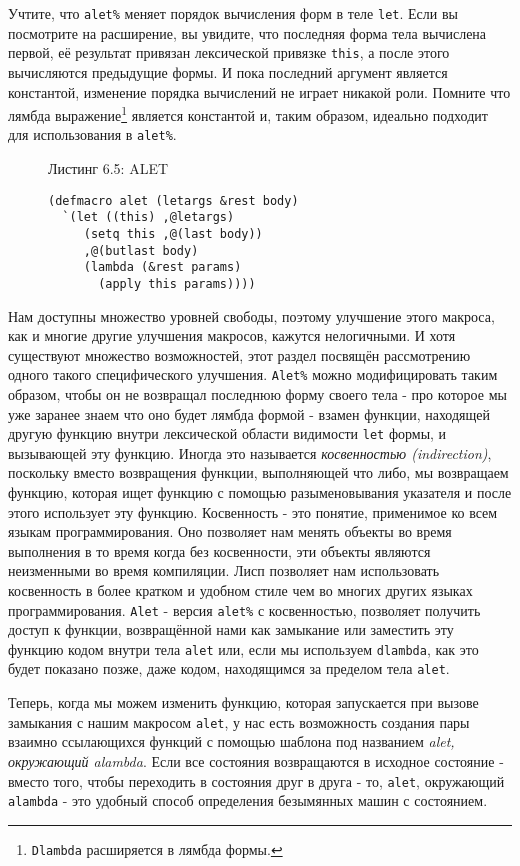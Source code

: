 Учтите, что \verb"alet%" меняет порядок вычисления форм в теле \verb"let". Если вы посмотрите на расширение, вы увидите, что последняя форма тела вычислена первой, её результат привязан лексической привязке \verb"this", а после этого вычисляются предыдущие формы. И пока последний аргумент является константой, изменение порядка вычислений не играет никакой роли. Помните что лямбда выражение\footnote{\verb"Dlambda" расширяется в лямбда формы.} является константой и, таким образом, идеально подходит для использования в \verb"alet%".



\begin{figure}Листинг 6.5: ALET\label{listing_6.5}
\listbegin
\begin{verbatim}
(defmacro alet (letargs &rest body)
  `(let ((this) ,@letargs)
     (setq this ,@(last body))
     ,@(butlast body)
     (lambda (&rest params)
       (apply this params))))
\end{verbatim}
\listend
\end{figure}

Нам доступны множество уровней свободы, поэтому улучшение этого макроса, как и многие другие улучшения макросов, кажутся нелогичными. И хотя существуют множество возможностей, этот раздел посвящён рассмотрению одного такого специфического улучшения. \verb"Alet%" можно модифицировать таким образом, чтобы он не возвращал последнюю форму своего тела - про которое мы уже заранее знаем что оно будет лямбда формой - взамен функции, находящей другую функцию внутри лексической области видимости \verb"let" формы, и вызывающей эту функцию. Иногда это называется \emph{косвенностью (indirection)}, поскольку вместо возвращения функции, выполняющей что либо, мы возвращаем функцию, которая ищет функцию с помощью разыменовывания указателя и после этого использует эту функцию. Косвенность - это понятие, применимое ко всем языкам программирования. Оно позволяет нам менять объекты во время выполнения в то время когда без косвенности, эти объекты являются неизменными во время компиляции. Лисп позволяет нам использовать косвенность в более кратком и удобном стиле чем во многих других языках программирования. \verb"Alet" - версия \verb"alet%" с косвенностью, позволяет получить доступ к функции, возвращённой нами как замыкание или заместить эту функцию кодом внутри тела \verb"alet" или, если мы используем \verb"dlambda", как это будет показано позже, даже кодом, находящимся за пределом тела \verb"alet".

Теперь, когда мы можем изменить функцию, которая запускается при вызове замыкания с нашим макросом \verb"alet", у нас есть возможность создания пары взаимно ссылающихся функций с помощью шаблона под названием \emph{alet, окружающий alambda}. Если все состояния возвращаются в исходное состояние - вместо того, чтобы переходить в состояния друг в друга - то, \verb"alet", окружающий \verb"alambda" - это удобный способ определения безымянных машин с состоянием.

